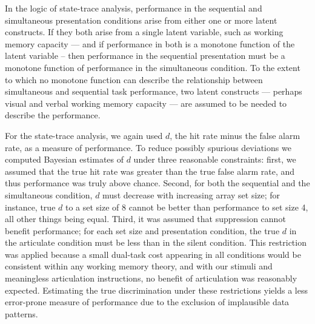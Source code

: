In the logic of state-trace analysis, performance in the sequential and simultaneous presentation conditions arise from either one or more latent constructs. If they both arise from a single latent variable, such as working memory capacity --- and if performance in both is a monotone function of the latent variable -- then performance in the sequential presentation must be a monotone function of performance in the simultaneous condition. To the extent to which no monotone function can describe the relationship between simultaneous and sequential task performance, two latent constructs --- perhaps visual and verbal working memory capacity --- are assumed to be needed to describe the performance.

For the state-trace analysis, we again used $d$, the hit rate minus the false alarm rate, as a measure of performance. To reduce possibly spurious deviations we computed Bayesian estimates of $d$ under three reasonable constraints: first, we assumed that the true hit rate was greater than the true false alarm rate, and thus performance was truly above chance. Second, for both the sequential and the simultaneous condition, $d$ must decrease with increasing array set size; for instance, true $d$ to a set size of 8 cannot be better than performance to set size 4, all other things being equal. Third, it was assumed that suppression cannot benefit performance; for each set size and presentation condition, the true $d$ in the articulate condition must be less than in the silent condition. This restriction was applied because a small dual-task cost appearing in all conditions would be consistent within any working memory theory, and with our stimuli and meaningless articulation instructions, no benefit of articulation was reasonably expected. Estimating the true discrimination under these restrictions yields a less error-prone measure of performance due to the exclusion of implausible data patterns. 

